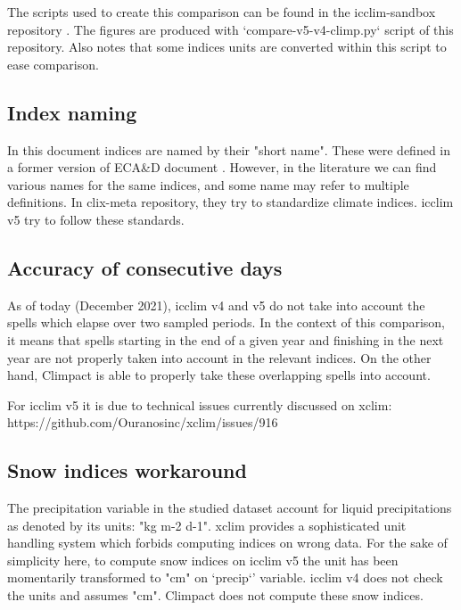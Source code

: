 \documentclass[a4paper,11pt]{article}
\begin{document}
        The scripts used to create this comparison can be found in the icclim-sandbox repository \cite{gh/icclim_sandbox}.
        The figures are produced with `compare-v5-v4-climp.py` script of this repository.
        Also notes that some indices units are converted within this script to ease comparison.

        \subsection{Index naming}
            In this document indices are named by their "short name". These were defined in a former version of ECA\&D document \cite{doc/ecad_old}.
            However, in the literature we can find various names for the same indices, and some name may refer to multiple definitions. In clix-meta \cite{gh/clixmeta} repository, they try to standardize climate indices. 
            icclim v5 try to follow these standards.

        \subsection{Accuracy of consecutive days}
            As of today (December 2021), icclim v4 and v5 do not take into account the spells which elapse over two sampled periods. In the context of this comparison, it means that spells starting in the end of a given year and finishing in the next year are not properly taken into account in the relevant indices.
            On the other hand, Climpact is able to properly take these overlapping spells into account.

            For icclim v5 it is due to technical issues currently discussed on xclim: https://github.com/Ouranosinc/xclim/issues/916

        \subsection{Snow indices workaround}
            The precipitation variable in the studied dataset account for liquid precipitations as denoted by its units: "kg m-2 d-1".
            xclim provides a sophisticated unit handling system which forbids computing indices on wrong data. For the sake of simplicity here, to compute snow indices on icclim v5 the unit has been momentarily transformed to "cm" on `precip`' variable.
            icclim v4 does not check the units and assumes "cm".
            Climpact does not compute these snow indices.
            
\end{document}
